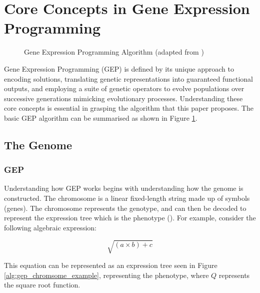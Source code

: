 \section{Core Concepts in Gene Expression Programming}\label{sec:gep_core_concepts}

\begin{figure}[H] %
	\centering %
	\caption{Gene Expression Programming Algorithm (adapted from \cite{ferreira2006gene})}
	\label{fig:gep_algorithm} %
\end{figure}

\parbreak Gene Expression Programming (GEP) is defined by its unique approach to encoding solutions, translating genetic representations into guaranteed functional outputs, and employing a suite of genetic operators to evolve populations over successive generations mimicking evolutionary processes. Understanding these core concepts is essential in grasping the algorithm that this paper proposes. The basic GEP algorithm can be summarised as shown in Figure \ref{fig:gep_algorithm}.

\subsection{The Genome}
\subsubsection{GEP}
Understanding how GEP works begins with understanding how the genome is constructed. The chromosome is a linear fixed-length string made up of symbols (genes). The chromosome represents the genotype, and can then be decoded to represent the expression tree which is the phenotype (\cite{ferreira2006gene}). For example, consider the following algebraic expression:
\begin{ceqn}
    \begin{equation}\label{alg:gep_chromsome_example}
        \sqrt{(a \times b) + c}
    \end{equation}
\end{ceqn}

\parbreak\noindent This equation can be represented as an expression tree seen in Figure \ref{alg:gep_chromsome_example}, representing the phenotype, where $Q$ represents the square root function.

